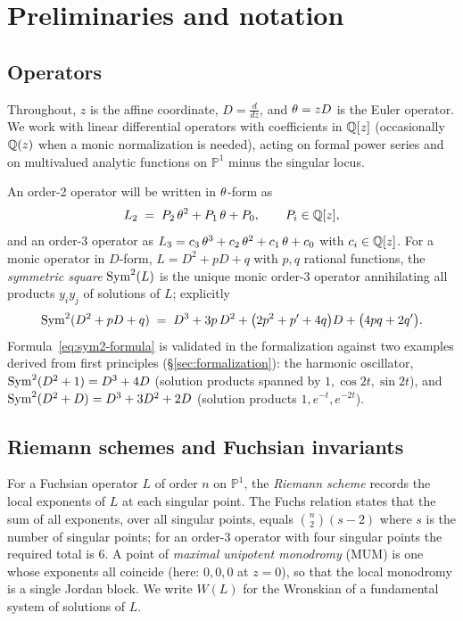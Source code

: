 \section{Preliminaries and notation}\label{sec:prelim}

\subsection{Operators}

Throughout, $z$ is the affine coordinate, $D = \frac{d}{dz}$, and
$\theta = zD$ is the Euler operator. We work with linear differential
operators with coefficients in $\mathbb{Q}[z]$ (occasionally $\mathbb{Q}(z)$ when a monic
normalization is needed), acting on formal power series and on multivalued
analytic functions on $\mathbb{P}^1$ minus the singular locus.

An order-2 operator will be written in $\theta$-form as
\begin{equation}\label{eq:L2-theta-form}
  L_2 \;=\; P_2\,\theta^2 + P_1\,\theta + P_0,
  \qquad P_i\in\mathbb{Q}[z],
\end{equation}
and an order-3 operator as
$L_3 = c_3\,\theta^3 + c_2\,\theta^2 + c_1\,\theta + c_0$ with
$c_i \in \mathbb{Q}[z]$. For a monic operator in $D$-form,
$L = D^2 + pD + q$ with $p,q$ rational functions, the \emph{symmetric square}
$\operatorname{Sym}^2(L)$ is the unique monic order-3 operator annihilating all products
$y_iy_j$ of solutions of $L$; explicitly
\begin{equation}\label{eq:sym2-formula}
  \operatorname{Sym}^2(D^2+pD+q) \;=\;
  D^3 + 3p\,D^2 + \bigl(2p^2 + p' + 4q\bigr)D + \bigl(4pq + 2q'\bigr).
\end{equation}
Formula~\eqref{eq:sym2-formula} is validated in the formalization against two
examples derived from first principles (\S\ref{sec:formalization}): the
harmonic oscillator, $\operatorname{Sym}^2(D^2+1) = D^3+4D$ (solution products spanned by
$1, \cos 2t, \sin 2t$), and $\operatorname{Sym}^2(D^2+D) = D^3+3D^2+2D$ (solution products
$1, e^{-t}, e^{-2t}$).

\subsection{Riemann schemes and Fuchsian invariants}

For a Fuchsian operator $L$ of order $n$ on $\mathbb{P}^1$, the
\emph{Riemann scheme} records the local exponents of $L$ at each singular
point. The Fuchs relation states that the sum of all exponents, over all
singular points, equals $\binom{n}{2}(s-2)$ where $s$ is the number of
singular points; for an order-3 operator with four singular points the
required total is $6$. A point of \emph{maximal unipotent monodromy} (MUM) is
one whose exponents all coincide (here: $0,0,0$ at $z=0$), so that the local
monodromy is a single Jordan block. We write $W(L)$ for the Wronskian of a
fundamental system of solutions of $L$.

